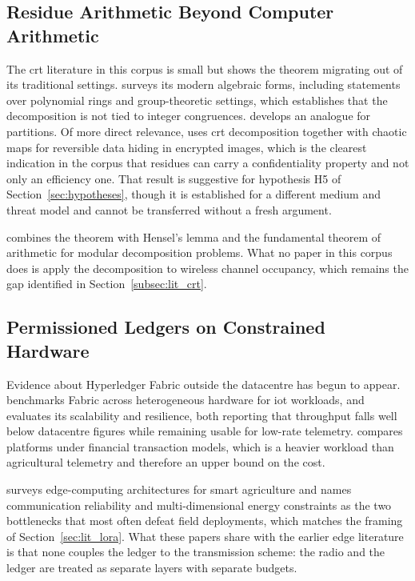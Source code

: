 \documentclass[12pt,a4paper,oneside]{book}
\begin{document}
\subsection{Residue Arithmetic Beyond Computer Arithmetic}
\label{subsec:lit_crt_extended}

The \gls{crt} literature in this corpus is small but shows the theorem
migrating out of its traditional settings.
\textcite{luo2023researchapplication} surveys its modern algebraic forms,
including statements over polynomial rings and group-theoretic settings, which
establishes that the decomposition is not tied to integer congruences.
\textcite{seethalakshmi2023chineseremainder} develops an analogue for
partitions. Of more direct relevance,
\textcite{yavuz2025reversibledata} uses \gls{crt} decomposition together with
chaotic maps for reversible data hiding in encrypted images, which is the
clearest indication in the corpus that residues can carry a confidentiality
property and not only an efficiency one. That result is suggestive for
hypothesis H5 of Section~\ref{sec:hypotheses}, though it is established for a
different medium and threat model and cannot be transferred without a fresh
argument.

\textcite{oktaviansyah2025hybridizinghensel} combines the theorem with Hensel's
lemma and the fundamental theorem of arithmetic for modular decomposition
problems. What no paper in this corpus does is apply the decomposition to
wireless channel occupancy, which remains the gap identified in
Section~\ref{subsec:lit_crt}.

\subsection{Permissioned Ledgers on Constrained Hardware}
\label{subsec:lit_edge_extended}

Evidence about Hyperledger Fabric outside the datacentre has begun to appear.
\textcite{zulkarnain2025performancebenchmarking} benchmarks Fabric across
heterogeneous hardware for \gls{iot} workloads, and
\textcite{pebriyanti2025evaluationscalability} evaluates its scalability and
resilience, both reporting that throughput falls well below datacentre figures
while remaining usable for low-rate telemetry.
\textcite{kwadzode2025performancecomparison} compares platforms under financial
transaction models, which is a heavier workload than agricultural telemetry and
therefore an upper bound on the cost.

\textcite{gong2025edge} surveys edge-computing architectures for smart
agriculture and names communication reliability and multi-dimensional energy
constraints as the two bottlenecks that most often defeat field deployments,
which matches the framing of Section~\ref{sec:lit_lora}. What these papers
share with the earlier edge literature is that none couples the ledger to the
transmission scheme: the radio and the ledger are treated as separate layers
with separate budgets.
\end{document}
